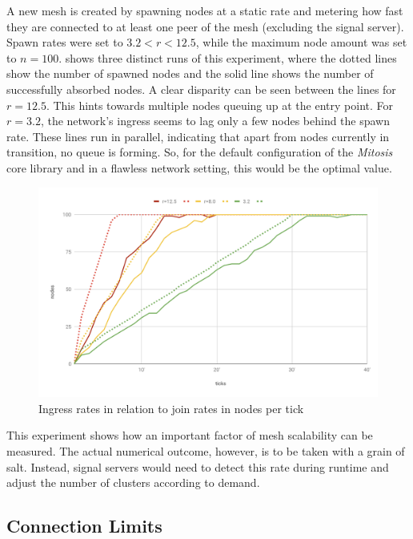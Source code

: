 A new mesh is created by spawning nodes at a static rate and metering how fast they are connected to at least one peer of the mesh (excluding the signal server). Spawn rates were set to $3.2<r<12.5$, while the maximum node amount was set to $n=100$.  shows three distinct runs of this experiment, where the dotted lines show the number of spawned nodes and the solid line shows the number of successfully absorbed nodes. A clear disparity can be seen between the lines for $r=12.5$. This hints towards multiple nodes queuing up at the entry point. For $r=3.2$, the network's ingress seems to lag only a few nodes behind the spawn rate. These lines run in parallel, indicating that apart from nodes currently in transition, no queue is forming. So, for the default configuration of the \textit{Mitosis} core library and in a flawless network setting, this would be the optimal value.

\begin{figure}[htb!]
\centering
\includegraphics[width=1.0\textwidth]{graphics/analysis/ingress-final.pdf}
\caption{Ingress rates in relation to join rates in nodes per tick}
\label{fig:ingress-rates}
\end{figure}

This experiment shows how an important factor of mesh scalability can be measured. The actual numerical outcome, however, is to be taken with a grain of salt. Instead, signal servers would need to detect this rate during runtime and adjust the number of clusters according to demand.


\subsection{Connection Limits}

